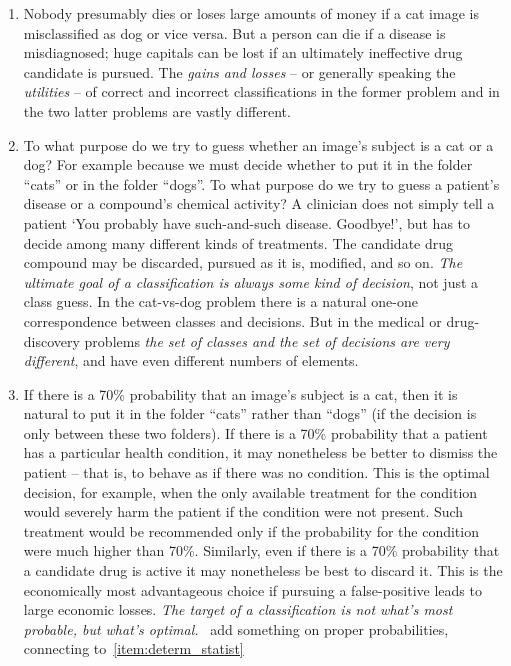\documentclass[\ifafour a4paper,12pt,\else a5paper,10pt,\fi%
onecolumn,oneside,article,%
british%
]{memoir}
\theoremstyle{remark}
\theoremstyle{innote}
\newcommand*{\pencil}{{\fontencoding{U}\fontfamily{fontawesometwo}\selectfont\symbol{210}}}
\newcommand{\mynotep}[1]{{\footnotesize\color{notecolour}\pencil\ #1}}
\renewcommand*{\|}[1][]{\nonscript\:#1\vert\nonscript\:\mathopen{}}
\begin{document}
\begin{enumerate}[label=(\roman*),wide]

\item\label{item:gain_loss}Nobody presumably dies or loses large amounts of money if a cat image is misclassified as dog or vice versa. But a person can die if a disease is misdiagnosed; huge capitals can be lost if an ultimately ineffective drug candidate is pursued. The \emph{gains and losses} -- or generally speaking the \emph{utilities} -- of correct and incorrect classifications in the former problem and in the two latter problems are vastly different.

\item\label{item:decisions_classes} To what purpose do we try to guess whether an image's subject is a cat or a dog? For example because we must decide whether to put it in the folder \enquote{cats} or in the folder \enquote{dogs}. To what purpose do we try to guess a patient's disease or a compound's chemical activity? A clinician does not simply tell a patient \enquote*{You probably have such-and-such disease. Goodbye!}, but has to decide among many different kinds of treatments. The candidate drug compound may be discarded, pursued as it is, modified, and so on. \emph{The ultimate goal of a classification is always some kind of decision}, not just a class guess. In the cat-vs-dog problem there is a natural one-one correspondence between classes and decisions. But in the medical or drug-discovery problems \emph{the set of classes and the set of decisions are very different}, and have even different numbers of elements.

\item\label{item:optimal_truth} If there is a 70\% probability that an image's subject is a cat, then it is natural to put it in the folder \enquote{cats} rather than \enquote{dogs} (if the decision is only between these two folders). If there is a 70\% probability that a patient has a particular health condition, it may nonetheless be better to dismiss the patient -- that is, to behave as if there was no condition. This is the optimal decision, for example, when the only available treatment for the condition would severely harm the patient if the condition were not present. Such treatment would be recommended only if the probability for the condition were much higher than 70\%. Similarly, even if there is a 70\% probability that a candidate drug is active it may nonetheless be best to discard it. This is the economically most advantageous choice if pursuing a false-positive leads to large economic losses. \emph{The target of a classification is not what’s most probable, but what’s optimal.} \mynotep{add something on proper probabilities, connecting to~\ref{item:determ_statist}}


\end{enumerate}
\end{document}
